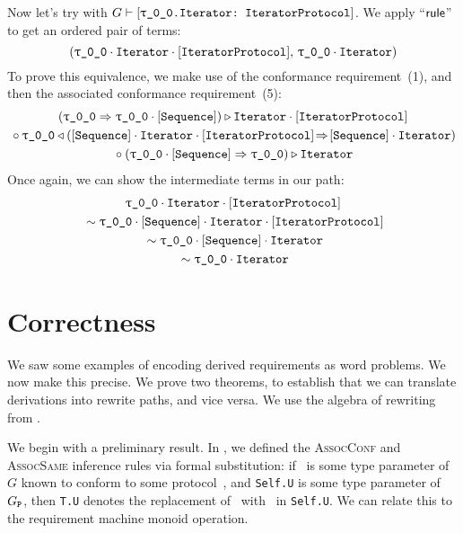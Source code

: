 \documentclass[../generics]{subfiles}
\begin{document}
\begin{example}
Now let's try with $G\vdash\ConfReq{\rT.Iterator}{IteratorProtocol}$. We apply ``$\mathsf{rule}$'' to get an ordered pair of terms:
\[
(\rT\cdot\nIterator\cdot\pIterator,\,\rT\cdot\nIterator)
\]
To prove this equivalence, we make use of the conformance requirement~(1), and then the associated conformance requirement~(5):
\begin{gather*}
(\rT\Rightarrow\rT\cdot\pSequence)\WR\nIterator\cdot\pIterator\\
{} \circ \rT\WL(\pSequence\cdot\nIterator\cdot\pIterator\!\Rightarrow\!\pSequence\cdot\nIterator)\\
{} \circ (\rT\cdot\pSequence\Rightarrow\rT)\WR\nIterator
\end{gather*}
Once again, we can show the intermediate terms in our path:
\begin{gather*}
\rT\cdot\nIterator\cdot\pIterator\\
{} \sim \rT\cdot\pSequence\cdot\nIterator\cdot\pIterator\\
{} \sim \rT\cdot\pSequence\cdot\nIterator\\
{} \sim \rT\cdot\nIterator
\end{gather*}
\end{example}

\section{Correctness}

We saw some examples of encoding derived requirements as word problems. We now make this precise. We prove two theorems, to establish that we can translate derivations into rewrite paths, and vice versa. We use the algebra of rewriting from .

We begin with a preliminary result. In , we defined the \textsc{AssocConf} and \textsc{AssocSame} inference rules via formal substitution: if \tT\ is some type parameter of~$G$ known to conform to some protocol~\tP, and \texttt{Self.U} is some type parameter of~$G_{\texttt{P}}$, then \texttt{T.U} denotes the replacement of \tSelf\ with \tT\ in \texttt{Self.U}. We can relate this to the requirement machine monoid operation.
\end{document}
